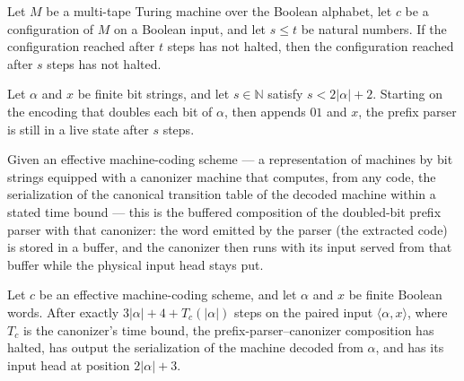 \begin{lemma}
\label{Turing.universal_live_before}
\leanok
{}
Let $M$ be a multi-tape Turing machine over the Boolean alphabet, let $c$ be a
configuration of $M$ on a Boolean input, and let $s\le t$ be natural numbers. If the
configuration reached after $t$ steps has not halted, then the configuration reached
after $s$ steps has not halted.
\end{lemma}

\begin{lemma}
\label{Turing.universalPrefix_live}
\leanok
{}
Let $\alpha$ and $x$ be finite bit strings, and let $s\in\mathbb N$ satisfy
$s<2|\alpha|+2$. Starting on the encoding that doubles each bit of $\alpha$, then
appends $01$ and $x$, the prefix parser is still in a live state after $s$ steps.
\end{lemma}

\begin{definition}
\label{Turing.universalCanonTM}
\leanok
{}
Given an effective machine-coding scheme --- a representation of machines by
bit strings equipped with a canonizer machine that computes, from any code,
the serialization of the canonical transition table of the decoded machine
within a stated time bound --- this is the buffered composition of the
doubled-bit prefix parser with that canonizer: the word emitted by the parser
(the extracted code) is stored in a buffer, and the canonizer then runs with
its input served from that buffer while the physical input head stays put.
\end{definition}

\begin{lemma}
\label{Turing.universalCanon_complete}
\leanok
{}
Let $c$ be an effective machine-coding scheme, and let $\alpha$ and $x$ be finite
Boolean words. After exactly $3|\alpha|+4+T_c(|\alpha|)$ steps on the paired input
$\langle\alpha,x\rangle$, where $T_c$ is the canonizer’s time bound, the
prefix-parser–canonizer composition has halted, has output the serialization of the
machine decoded from $\alpha$, and has its input head at position $2|\alpha|+3$.
\end{lemma}

